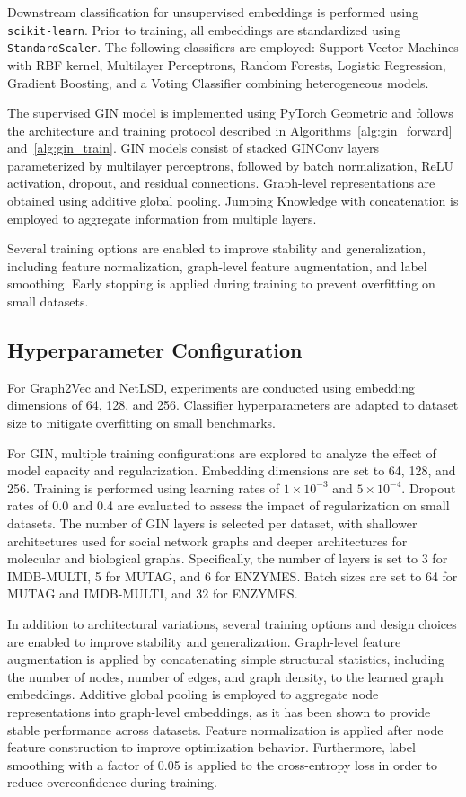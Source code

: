 Downstream classification for unsupervised embeddings is performed using \texttt{scikit-learn}.
Prior to training, all embeddings are standardized using \texttt{StandardScaler}.
The following classifiers are employed: Support Vector Machines with RBF kernel, Multilayer Perceptrons,
Random Forests, Logistic Regression, Gradient Boosting, and a Voting Classifier combining heterogeneous
models.

The supervised GIN model is implemented using PyTorch Geometric and follows the architecture and
training protocol described in Algorithms~\ref{alg:gin_forward} and~\ref{alg:gin_train}.
GIN models consist of stacked GINConv layers parameterized by multilayer perceptrons, followed by
batch normalization, ReLU activation, dropout, and residual connections.
Graph-level representations are obtained using additive global pooling.
Jumping Knowledge with concatenation is employed to aggregate information from multiple layers.

Several training options are enabled to improve stability and generalization, including feature
normalization, graph-level feature augmentation, and label smoothing.
Early stopping is applied during training to prevent overfitting on small datasets.

\subsection{Hyperparameter Configuration}
For Graph2Vec and NetLSD, experiments are conducted using embedding dimensions of 64, 128, and 256.
Classifier hyperparameters are adapted to dataset size to mitigate overfitting on small benchmarks.

For GIN, multiple training configurations are explored to analyze the effect of model capacity
and regularization.
Embedding dimensions are set to 64, 128, and 256.
Training is performed using learning rates of $1 \times 10^{-3}$ and $5 \times 10^{-4}$.
Dropout rates of 0.0 and 0.4 are evaluated to assess the impact of regularization on small datasets.
The number of GIN layers is selected per dataset, with shallower architectures used for social
network graphs and deeper architectures for molecular and biological graphs.
Specifically, the number of layers is set to 3 for IMDB-MULTI, 5 for MUTAG, and 6 for ENZYMES.
Batch sizes are set to 64 for MUTAG and IMDB-MULTI, and 32 for ENZYMES.

In addition to architectural variations, several training options and design choices are enabled
to improve stability and generalization.
Graph-level feature augmentation is applied by concatenating simple structural statistics,
including the number of nodes, number of edges, and graph density, to the learned graph embeddings.
Additive global pooling is employed to aggregate node representations into graph-level embeddings,
as it has been shown to provide stable performance across datasets.
Feature normalization is applied after node feature construction to improve optimization behavior.
Furthermore, label smoothing with a factor of 0.05 is applied to the cross-entropy loss in order
to reduce overconfidence during training.

